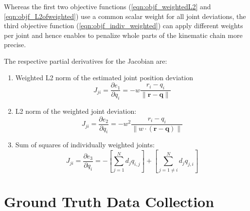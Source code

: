 Whereas the first two objective functions (\ref{eqn:objf_weightedL2} and \ref{eqn:objf_L2ofweighted}) use a common scalar weight for all joint deviations, the third objective function (\ref{eqn:objf_indiv_weighted}) can apply different weights per joint and hence enables to penalize whole parts of the kinematic chain more precise.

The respective partial derivatives for the Jacobian are:
\begin{enumerate}
\item Weighted L2 norm of the estimated joint position deviation
\begin{equation}
J_{ji} = \frac{\partial e_1}{\partial q_i} = -w \frac{r_i - q_i}{\lVert \mathbf{r} - \mathbf{q} \rVert}
\end{equation}

\item L2 norm of the weighted joint deviation:
\begin{equation}
J_{ji} = \frac{\partial e_2}{\partial q_i} = -w^2 \frac{r_i - q_i}{\lVert w \cdot (\mathbf{r} - \mathbf{q}) \rVert}
\end{equation}

\item Sum of squares of individually weighted joints:
\begin{equation}
J_{ji} = \frac{\partial e_3}{\partial q_i} = - \left[ \sum_{j=1}^N d_jq_{i,j}\right] + \left[ \sum_{j=1 \neq i}^N d_jq_{j,i}\right]
\end{equation}
\end{enumerate}


\section{Ground Truth Data Collection}

